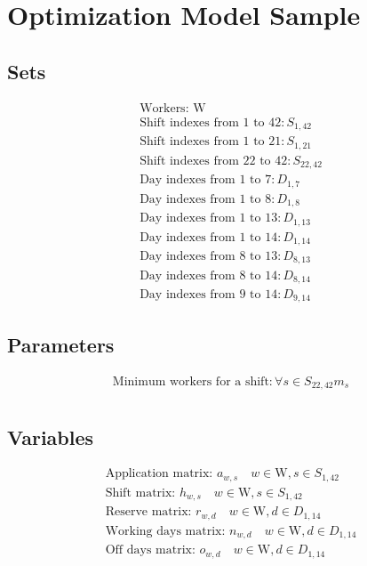\documentclass{article}
\begin{document}
\section*{Optimization Model Sample}

\subsection*{Sets}
\begin{align*}
\text{Workers: W} \\
\text{Shift indexes from 1 to 42}: S_{1, 42} \\
\text{Shift indexes from 1 to 21}: S_{1, 21} \\
\text{Shift indexes from 22 to 42}: S_{22, 42} \\
\text{Day indexes from 1 to 7}: D_{1, 7} \\
\text{Day indexes from 1 to 8}: D_{1, 8} \\
\text{Day indexes from 1 to 13}: D_{1, 13} \\
\text{Day indexes from 1 to 14}: D_{1, 14} \\
\text{Day indexes from 8 to 13}: D_{8, 13} \\
\text{Day indexes from 8 to 14}: D_{8, 14} \\
\text{Day indexes from 9 to 14}: D_{9, 14} 
\end{align*}

\subsection*{Parameters}
\begin{align*}
\text{Minimum workers for a shift}: \forall s \in S_{22, 42} m_{s} \\
\end{align*}

\subsection*{Variables}
\begin{align*}
\text{Application matrix: } a_{w, s} \quad w \in \text{W}, s \in S_{1, 42} \\
\text{Shift matrix: } h_{w, s} \quad w \in \text{W}, s \in S_{1, 42}\\
\text{Reserve matrix: } r_{w, d} \quad w \in \text{W}, d \in D_{1, 14} \\
\text{Working days matrix: } n_{w, d} \quad w \in \text{W}, d \in D_{1, 14} \\
\text{Off days matrix: } o_{w, d} \quad w \in \text{W}, d \in D_{1, 14} 
\end{align*}
\end{document}
